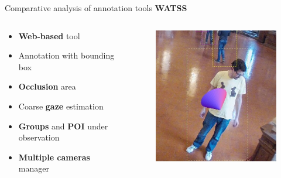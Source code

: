 \documentclass{beamer}
\begin{document}
\begin{tframe}{Comparative analysis of annotation tools}
\textbf{WATSS} 
\begin{columns}[t] %
\begin{column}{.45\textwidth}
\begin{itemize}
\item \textbf{Web-based} tool
\vspace{0.1cm}
\item Annotation with bounding box
\vspace{0.1cm}
\item \textbf{Occlusion} area
\vspace{0.1cm}
\item Coarse \textbf{gaze} estimation
\vspace{0.1cm}
\item \textbf{Groups} and \textbf{POI} under observation
\vspace{0.1cm}
\item \textbf{Multiple cameras} manager
\end{itemize}
\end{column}%
\begin{column}{.3\textwidth}
\begin{figure}[h]
\centering
\includegraphics[width=1\textwidth]{images/gaze.jpg}
\end{figure}
\end{column}%
\end{columns}
\end{tframe}
\end{document}
